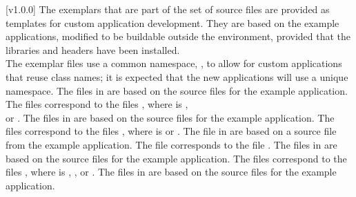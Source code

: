 [v1.0.0]
The exemplars that are part of the \mplusm{} set of source files are
provided as templates for custom application development.
They are based on the example applications, modified to be buildable outside the \mplusm{}
environment, provided that the \mplusm{} libraries and headers have been installed.\\

The exemplar files use a common namespace, , to allow for custom
applications that re\longDash{}use class names; it is expected that the new applications
will use a unique namespace.
The files in  are based on the source files for the
 example application.
The files  correspond to the files
, where  is ,\\
 or .
The files in  are based on the source files for the
 example application.
The files  correspond to the files
, where  is  or .
The file in  are based on a source file from the
 example application.
The file  corresponds to the file
.
The files in  are based on the source files for the
 example application.
The files  correspond to the files
, where  is ,
,  or .
The files in  are based on the source files for the
 example application.
